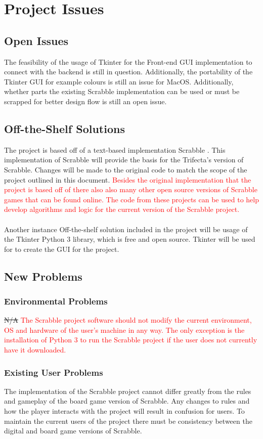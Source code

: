 \documentclass[12pt, titlepage]{article}
\begin{document}
\section{Project Issues}

\subsection{Open Issues}%
The feasibility of the usage of Tkinter for the Front-end GUI implementation to connect with the backend is still in question. Additionally, the portability of the Tkinter GUI for example colours is still an issue for MacOS. Additionally, whether parts the existing Scrabble implementation can be used or must be scrapped for better design flow is still an open issue.


\subsection{Off-the-Shelf Solutions}
The project is based off of a text-based implementation Scrabble \cite{fayrose_2019}. This implementation of Scrabble will provide the basis for the Trifecta's version of Scrabble. Changes will be made to the original code to match the scope of the project outlined in this document. \textcolor{red}{Besides the original implementation that the project is based off of there also also many other open source versions of Scrabble games that can be found online. The code from these projects can be used to help develop algorithms and logic for the current version of the Scrabble project.} \\ \\
Another instance Off-the-shelf solution included in the project will be usage of the Tkinter Python 3 library, which is free and open source. Tkinter will be used for to create the GUI for the project.
\subsection{New Problems}
\subsubsection{Environmental Problems}
\sout{N/A} \textcolor{red}{The Scrabble project software should not modify the current environment, OS and hardware of the user's machine in any way. The only exception is the installation of Python 3 to run the Scrabble project if the user does not currently have it downloaded.}
\subsubsection{Existing User Problems}
The implementation of the Scrabble project cannot differ greatly from the rules and gameplay of the board game version of Scrabble. Any changes to rules and how the player interacts with the project will result in confusion for users. To maintain the current users of the project there must be consistency between the digital and board game versions of Scrabble. 
\end{document}
